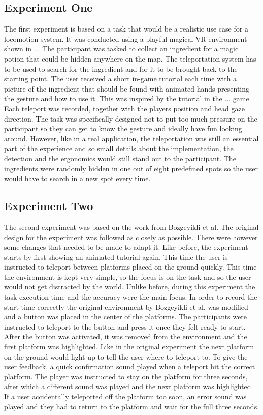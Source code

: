 \subsection{Experiment One}
The first experiment is based on a task that would be a realistic use case for a locomotion system. It was conducted using a playful magical VR environment shown in ... %
The participant was tasked to collect an ingredient for a magic potion that could be hidden anywhere on the map. The teleportation system has to be used to search for the ingredient and for it to be brought back to the starting point. The user received a short in-game tutorial each time with a picture of the ingredient that should be found with animated hands presenting the gesture and how to use it. This was inspired by the tutorial in the ... game %
Each teleport was recorded, together with the players position and head gaze direction. The task was specifically designed not to put too much pressure on the participant so they can get to know the gesture and ideally have fun looking around. However, like in a real application, the teleportation was still an essential part of the experience and so small details about the implementation, the detection and the ergonomics would still stand out to the participant. The ingredients were randomly hidden in one out of eight predefined spots so the user would have to search in a new spot every time.

\subsection{Experiment Two}
The second experiment was based on the work from Bozgeyikli et al. %
The original design for the experiment was followed as closely as possible. There were however some changes that needed to be made to adapt it. Like before, the experiment starts by first showing an animated tutorial again. This time the user is instructed to teleport between platforms placed on the ground quickly. This time the environment is kept very simple, so the focus is on the task and so the user would not get distracted by the world. Unlike before, during this experiment the task execution time and the accuracy were the main focus. In order to record the start time correctly the original environment by Bozgeyikli et al. was modified and a button was placed in the center of the platforms. The participants were instructed to teleport to the button and press it once they felt ready to start. After the button was activated, it was removed from the environment and the first platform was highlighted. Like in the original experiment the next platform on the ground would light up to tell the user where to teleport to. To give the user feedback, a quick confirmation sound played when a teleport hit the correct platform. The player was instructed to stay on the platform for three seconds, after which a different sound was played and the next platform was highlighted. If a user accidentally teleported off the platform too soon, an error sound was played and they had to return to the platform and wait for the full three seconds. 

